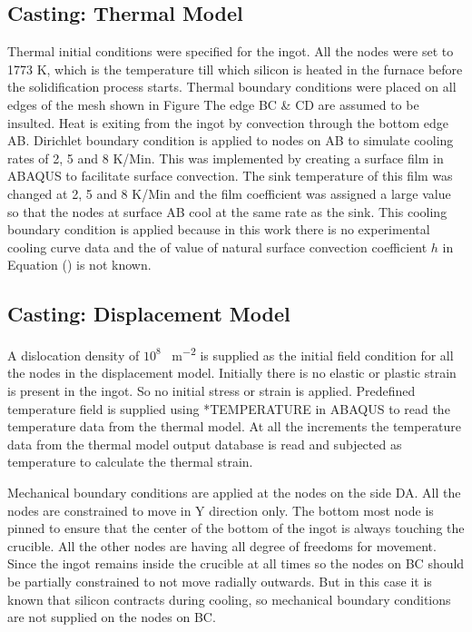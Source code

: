 \subsection{Casting: Thermal Model}
Thermal initial conditions were specified for the ingot. All the nodes were set to 1773 K, which is the temperature till which silicon is heated in the furnace before the solidification process starts. 
Thermal boundary conditions were placed on all edges of the mesh shown in Figure The edge BC \& CD are assumed to be insulted. Heat is exiting from the ingot by convection through the bottom edge AB. Dirichlet boundary condition is applied to nodes on AB to simulate cooling rates of 2, 5 and 8 K/Min. This was implemented by creating a surface film in ABAQUS to facilitate surface convection. The sink temperature of this film was changed at 2, 5 and 8 K/Min and the film coefficient was assigned a large value so that the nodes at surface AB cool at the same rate as the sink. This cooling boundary condition is applied because in this work there is no experimental cooling curve data and the of value of natural surface convection coefficient $h$ in Equation () is not known. 

\subsection{Casting: Displacement Model}

A dislocation density of $10^8$ \SI{}{m^{-2}} is supplied as the initial field condition for all the nodes in the displacement model. Initially there is no elastic or plastic strain is present in the ingot. So no initial stress or strain is applied. Predefined temperature field is supplied using *TEMPERATURE in ABAQUS to read the temperature data from the thermal model. At all the increments the temperature data from the thermal model output database is read and subjected as temperature to calculate the thermal strain.

Mechanical boundary conditions are applied at the nodes on the side DA. All the nodes are constrained to move in Y direction only. The bottom most node is pinned to ensure that the center of the bottom of the ingot is always touching the crucible. All the other nodes are having all degree of freedoms for movement. Since the ingot remains inside the crucible at all times so the nodes on BC should be partially constrained to not move radially outwards. But in this case it is known that silicon contracts during cooling, so mechanical boundary conditions are not supplied on the nodes on BC.

